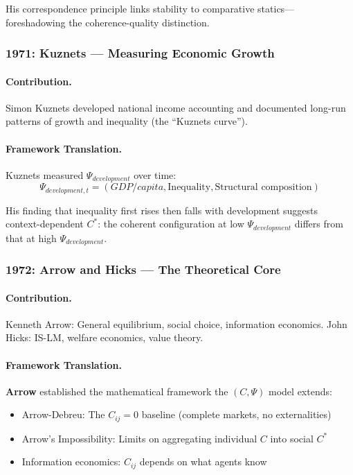 His correspondence principle links stability to comparative statics---
foreshadowing the coherence-quality distinction.

\subsubsection{1971: Kuznets --- Measuring Economic Growth}

\paragraph{Contribution.}
Simon Kuznets developed national income accounting and documented
long-run patterns of growth and inequality (the ``Kuznets curve'').

\paragraph{Framework Translation.}
Kuznets measured $\Psi_{development}$ over time:
\begin{equation}
  \Psi_{development,t} = (GDP/capita, \text{Inequality}, \text{Structural composition})
\end{equation}

His finding that inequality first rises then falls with development
suggests context-dependent $C^*$: the coherent configuration
at low $\Psi_{development}$ differs from that at high $\Psi_{development}$.

\subsubsection{1972: Arrow and Hicks --- The Theoretical Core}

\paragraph{Contribution.}
Kenneth Arrow: General equilibrium, social choice, information economics.
John Hicks: IS-LM, welfare economics, value theory.

\paragraph{Framework Translation.}
\textbf{Arrow} established the mathematical framework the $(C, \Psi)$ model extends:
\begin{itemize}
  \item Arrow-Debreu: The $C_{ij} = 0$ baseline (complete markets, no externalities)
  \item Arrow's Impossibility: Limits on aggregating individual $C$ into social $C^*$
  \item Information economics: $C_{ij}$ depends on what agents know
\end{itemize}

